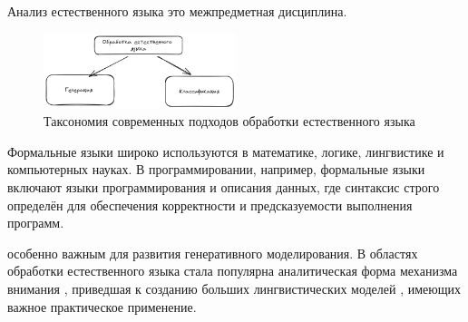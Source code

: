 Анализ естественного языка это межпредметная дисциплина.

\begin{figure}[h]
    \centering
    \includegraphics[width=0.5\textwidth]{assets/ml/nlp/taxonomy.excalidraw.png}
    \caption{Таксономия современных подходов обработки естественного языка}
    \label{llm_taxonomy}
\end{figure}

Формальные языки широко используются в математике, логике, лингвистике и компьютерных науках. 
В программировании, например, формальные языки включают языки программирования и описания данных, 
где синтаксис строго определён для обеспечения корректности и предсказуемости выполнения программ.

особенно важным для развития генеративного моделирования.
В областях обработки естественного языка стала популярна аналитическая форма механизма внимания \cite{vaswani2017attention},
приведшая к созданию больших лингвистических моделей \cite{radford2019language}, имеющих важное практическое применение.

